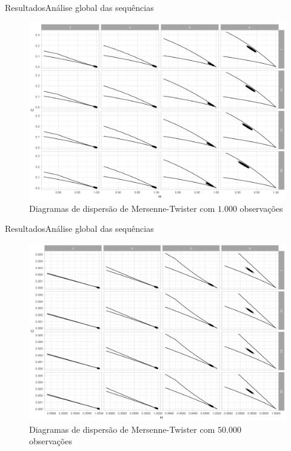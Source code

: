 \documentclass[10pt,xcolor={dvipsnames}]{beamer}
\begin{document}
\begin{frame}{Resultados}{Análise global das sequências}
	\begin{figure}[hbt]
		\centering
		\includegraphics[width=.9\linewidth]{ScatterAll_MT_1k}
		\caption{Diagramas de dispersão de Mersenne-Twister com $1.000$ observações} %
	\end{figure}
\end{frame}

\begin{frame}{Resultados}{Análise global das sequências}
	\begin{figure}[hbt]
		\centering
		\includegraphics[width=.9\linewidth]{ScatterAll_MT_50k}
		\caption{Diagramas de dispersão de Mersenne-Twister com $50.000$ observações} %
	\end{figure}
\end{frame}
\end{document}
